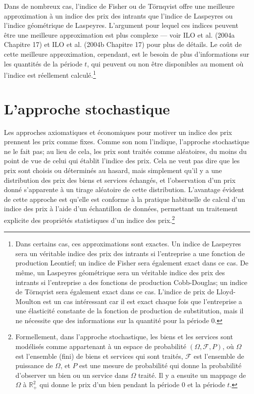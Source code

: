 \documentclass[]{article}
\begin{document}
Dans de nombreux cas, l'indice de Fisher ou de Törnqvist offre une meilleure approximation à un indice des prix des intrants que l'indice de Laspeyres ou l'indice géométrique de Laspeyres. L'argument pour lequel ces indices peuvent être une meilleure approximation est plus complexe --- voir ILO et al. (2004a Chapitre 17) et ILO et al. (2004b Chapitre 17) pour plus de détails. Le coût de cette meilleure approximation, cependant, est le besoin de plus d'informations sur les quantités de la période \(t\), qui peuvent ou non être disponibles au moment où l'indice est réellement calculé.\footnote{Dans certains cas, ces approximations sont exactes. Un indice de Laspeyres sera un véritable indice des prix des intrants si l'entreprise a une fonction de production Leontief; un indice de Fisher sera également exact dans ce cas. De même, un Laspeyres géométrique sera un véritable indice des prix des intrants si l'entreprise a des fonctions de production Cobb-Douglas; un indice de Törnqvist sera également exact dans ce cas. L'indice de prix de Lloyd-Moulton est un cas intéressant car il est exact chaque fois que l'entreprise a une élasticité constante de la fonction de production de substitution, mais il ne nécessite que des informations sur la quantité pour la période 0.}

\hypertarget{lapproche-stochastique}{%
\section{L'approche stochastique}\label{lapproche-stochastique}}

Les approches axiomatiques et économiques pour motiver un indice des prix prennent les prix comme fixes. Comme son nom l'indique, l'approche stochastique ne le fait pas; au lieu de cela, les prix sont traités comme aléatoires, du moins du point de vue de celui qui établit l'indice des prix. Cela ne veut pas dire que les prix sont choisis ou déterminés au hasard, mais simplement qu'il y a une distribution des prix des biens et services échangés, et l'observation d'un prix donné s'apparente à un tirage aléatoire de cette distribution. L'avantage évident de cette approche est qu'elle est conforme à la pratique habituelle de calcul d'un indice des prix à l'aide d'un échantillon de données, permettant un traitement explicite des propriétés statistiques d'un indice des prix.\footnote{Formellement, dans l'approche stochastique, les biens et les services sont modélisés comme appartenant à un espace de probabilité \((\Omega, \mathcal{F}, P)\), où \(\Omega\) est l'ensemble (fini) de biens et services qui sont traités, \(\mathcal{F}\) est l'ensemble de puissance de \(\Omega\), et \(P\) est une mesure de probabilité qui donne la probabilité d'observer un bien ou un service dans \(\Omega\) traité. Il y a ensuite un mappage de \(\Omega\) à \(\mathbb{R}_{+}^{2}\) qui donne le prix d'un bien pendant la période 0 et la période \(t\).}
\end{document}
